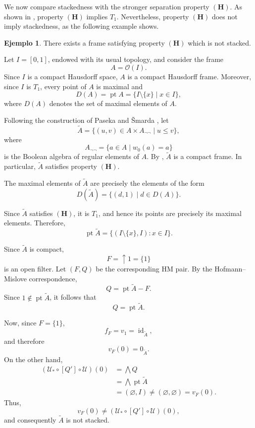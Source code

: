 \documentclass[11pt]{amsart}
\DeclareMathOperator{\pt}{pt}
\DeclareMathOperator{\id}{id}
\theoremstyle{plain}
\theoremstyle{definition}
\newtheorem{ej}[thm]{Ejemplo}
\begin{document}
We now compare stackedness with the stronger separation property
$\mathbf{(H)}$. As shown in \cite{PasekaSmarda1992}, property $\mathbf{(H)}$ implies $T_1$. Nevertheless, property
$\mathbf{(H)}$ does not imply stackedness, as the following example shows.

\begin{ej}\label{HnoS}
There exists a frame satisfying property $\mathbf{(H)}$ which is not stacked.

Let $I=[0,1]$, endowed with its usual topology, and consider the frame
\[
    A=\mathcal{O}(I).
\]
Since $I$ is a compact Hausdorff space, $A$ is a compact Hausdorff frame.
Moreover, since $I$ is $T_1$, every point of $A$ is maximal and
\[
    D(A)=\pt A
    =
    \{I\setminus\{x\}\mid x\in I\},
\]
where $D(A)$ denotes the set of maximal elements of $A$.

Following the construction of Paseka and \v{S}marda
\cite[Proposition 2.3]{PasekaSmarda1992}, let
\[
    \widetilde{A}
    =
    \{(u,v)\in A\times A_{\neg\neg}\mid u\leq v\},
\]
where
\[
    A_{\neg\neg}=\{a\in A\mid w_0(a)=a\}
\]
is the Boolean algebra of regular elements of $A$. By
\cite[Propositions 2.3 and 2.4]{PasekaSmarda1992}, $\widetilde{A}$ is a compact frame. 
In particular, $\widetilde{A}$ satisfies property $\mathbf{(H)}$.

The maximal elements of $\widetilde{A}$ are precisely the elements of the
form
\[
    D(\widetilde{A})=\{(d,1)\mid d\in D(A)\}.
\]

Since $\widetilde{A}$ satisfies $\mathbf{(H)}$, it is $T_1$, and hence its points
are precisely its maximal elements. Therefore,
\[
    \pt\widetilde{A}
    =
    \{(I\setminus\{x\},I):x\in I\}.
\]

Since $\widetilde{A}$ is compact,
\[
    F=\uparrow 1=\{1\}
\]
is an open filter. Let $(F,Q)$ be the corresponding HM pair. By the
Hofmann--Mislove correspondence,
\[
    Q=\pt\widetilde{A}-F.
\]
Since $1\notin\pt\widetilde{A}$, it follows that
\[
    Q=\pt\widetilde{A}.
\]

Now, since $F=\{1\}$,
\[
    f_F=v_1=\id_{\widetilde{A}},
\]
and therefore
\[
    v_F(0)=0_{\widetilde{A}}.
\]
On the other hand,
\[
\begin{aligned}
    (\mathcal{U}_*\circ[Q']\circ \mathcal{U})(0)
    &=
    \bigwedge Q\\
    &=
    \bigwedge\pt\widetilde{A}\\
    &=
    (\varnothing,I)
    \neq
    (\varnothing,\varnothing)
    =
    v_F(0).
\end{aligned}
\]
Thus,
\[
    v_F(0)\neq(\mathcal{U}_*\circ[Q']\circ \mathcal{U})(0),
\]
and consequently $\widetilde{A}$ is not stacked.
\end{ej}
\end{document}
